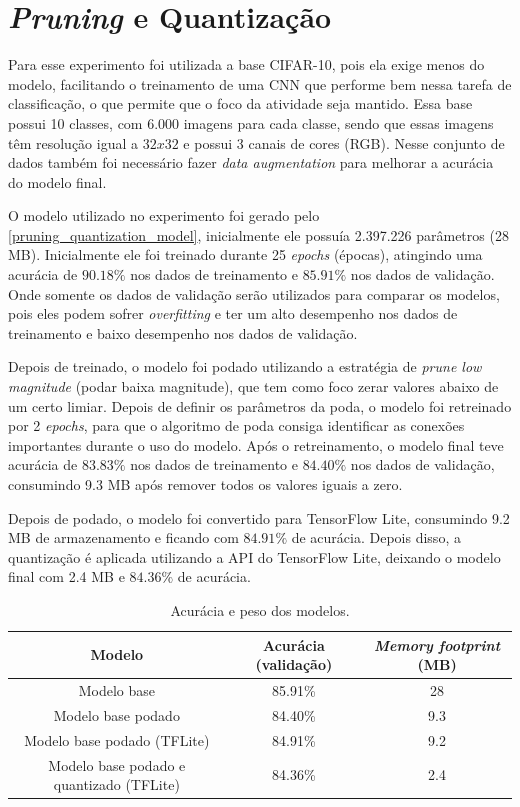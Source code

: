 \section{\textit{Pruning} e Quantização}

Para esse experimento foi utilizada a base CIFAR-10, pois ela exige menos do modelo, facilitando o treinamento de uma
CNN que performe bem nessa tarefa de classificação, o que permite que o foco da atividade seja mantido.
Essa base possui 10 classes, com  6.000 imagens para cada classe, sendo que essas imagens têm resolução igual a
$32x32$ e possui 3 canais de cores (RGB). Nesse conjunto de dados também foi necessário fazer
\textit{data augmentation} para melhorar a acurácia do modelo final.

O modelo utilizado no experimento foi gerado pelo \autoref{pruning_quantization_model}, inicialmente ele possuía
2.397.226 parâmetros (28 MB). Inicialmente ele foi treinado durante 25 \textit{epochs} (épocas), atingindo
uma acurácia de $90.18\%$ nos dados de treinamento e $85.91\%$ nos dados de validação.
Onde somente os dados de validação serão utilizados para comparar os modelos, pois eles podem sofrer
\textit{overfitting} e ter um alto desempenho nos dados de treinamento e baixo desempenho nos dados de validação.

Depois de treinado, o modelo foi podado utilizando a estratégia de \textit{prune low magnitude}
(podar baixa magnitude), que tem como foco zerar valores abaixo de um certo limiar. Depois de definir os parâmetros da
poda, o modelo foi retreinado por 2 \textit{epochs}, para que o algoritmo de poda consiga identificar as conexões
importantes durante o uso do modelo.
Após o retreinamento, o modelo final teve acurácia de $83.83\%$ nos dados de treinamento e $84.40\%$ nos dados de
validação, consumindo 9.3 MB após remover todos os valores iguais a zero.

Depois de podado, o modelo foi convertido para TensorFlow Lite, consumindo 9.2 MB de armazenamento e ficando com
$84.91\%$ de acurácia. Depois disso, a quantização é aplicada utilizando a API do TensorFlow Lite, deixando o modelo
final com 2.4 MB e $84.36\%$ de acurácia.

\begin{center}
\begin{table}[htb]
\centering
\ABNTEXfontereduzida
\caption[Acurácia e peso dos modelos]{Acurácia e peso dos modelos.}
\label{tabela_acuracia_peso}
\begin{tabular}{ |c|c|c| }
	\hline
	\textbf{Modelo} & \textbf{Acurácia (validação)}  & \textbf{\textit{Memory footprint} (MB)} \\
	\hline
	Modelo base 				 & 	85.91\% 	& 	28	\\
	Modelo base podado 			 & 	84.40\% 	& 	9.3	\\
	Modelo base podado (TFLite) 		 & 	84.91\% 	& 	9.2	\\
	Modelo base podado e quantizado (TFLite) & 	84.36\% 	& 	2.4	\\
	\hline
\end{tabular}
\end{table}
\end{center}

